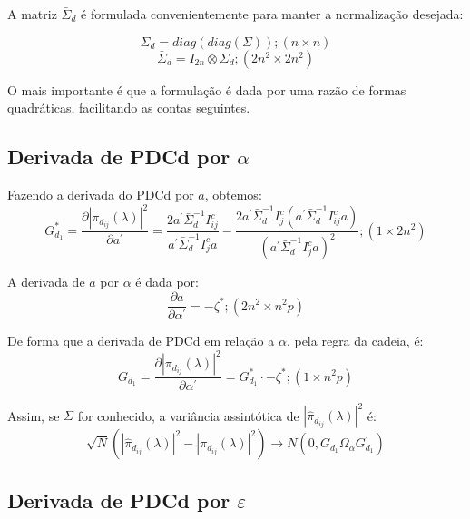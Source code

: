 \documentclass[a4paper,10pt]{article}
\begin{document}
A matriz $\bar{\Sigma}_{d}$ é formulada convenientemente para manter a normalização desejada:

\begin{equation}
\Sigma_{d} = diag(diag(\Sigma)); (n \times n)
\end{equation}
\begin{equation}
\bar{\Sigma}_{d} = I_{2n} \otimes \Sigma_{d}; (2n^{2} \times 2n^{2})
\end{equation}

O mais importante é que a formulação é dada por uma razão de formas quadráticas, facilitando as contas seguintes.

\subsection{Derivada de PDCd por $\alpha$}

Fazendo a derivada do PDCd por $a$, obtemos:
\begin{equation}
G_{d_1}^{\ast} = \frac{\partial |\pi_{d_{ij}}(\lambda)|^{2}}{\partial a^{'}} = \frac{2 a^{'} \bar{\Sigma}_{d}^{-1} I_{ij}^{c}} {a^{'} \bar{\Sigma}_{d}^{-1} I_{j}^{c} a} - \frac{2 a^{'} \bar{\Sigma}_{d}^{-1} I_{j}^{c} (a^{'} \bar{\Sigma}_{d}^{-1} I_{ij}^{c} a)} {(a^{'} \bar{\Sigma}_{d}^{-1} I_{j}^{c} a)^{2}}; (1 \times 2n^{2})
\end{equation}

A derivada de $a$ por $\alpha$ é dada por:
\begin{equation}
\frac{\partial a}{\partial \alpha^{'}} = -\zeta^{\ast}; (2n^{2} \times n^{2}p)
\end{equation}

De forma que a derivada de PDCd em relação a $\alpha$, pela regra da cadeia, é:
\begin{equation}
G_{d_1} = \frac{\partial |\pi_{d_{ij}}(\lambda)|^{2}}{\partial \alpha^{'}} = G_{d_1}^{\ast} \cdot -\zeta^{\ast}; (1 \times n^{2}p)
\end{equation}

Assim, se $\Sigma$ for conhecido, a variância assintótica de $|\hat{\pi}_{d_{ij}}(\lambda)|^{2}$ é:
\begin{equation}
\sqrt{N} (|\hat{\pi}_{d_{ij}}(\lambda)|^{2} - |\pi_{d_{ij}}(\lambda)|^{2}) \to N(0, G_{d_1} \Omega_{\alpha} G_{d_1}^{'}) 
\end{equation}
\subsection{Derivada de PDCd por $\varepsilon$}
\end{document}
